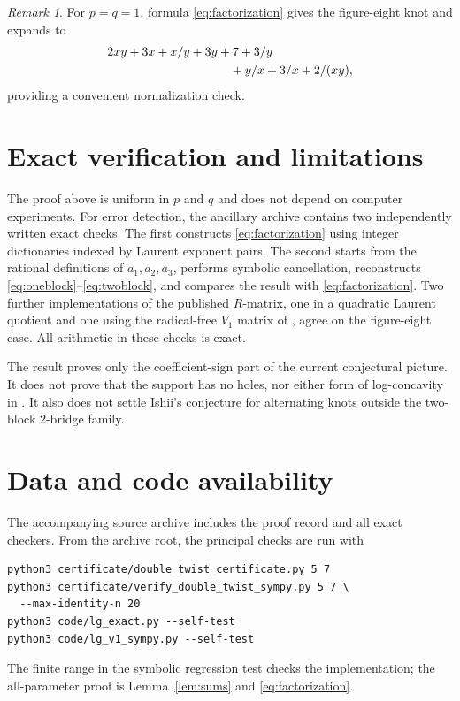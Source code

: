 \documentclass[11pt]{amsart}
\theoremstyle{remark}
\newtheorem{remark}[theorem]{Remark}
\begin{document}
\begin{remark}
For $p=q=1$, formula \eqref{eq:factorization} gives the figure-eight knot
and expands to
\begin{align*}
&2xy+3x+x/y+3y+7+3/y\\
&\hspace{35mm}+y/x+3/x+2/(xy),
\end{align*}
providing a convenient normalization check.
\end{remark}

\section{Exact verification and limitations}

The proof above is uniform in $p$ and $q$ and does not depend on computer
experiments.  For error detection, the ancillary archive contains two
independently written exact checks.  The first constructs
\eqref{eq:factorization} using integer dictionaries indexed by Laurent
exponent pairs.  The second starts from the rational definitions of
$a_1,a_2,a_3$, performs symbolic cancellation, reconstructs
\eqref{eq:oneblock}--\eqref{eq:twoblock}, and compares the result with
\eqref{eq:factorization}.  Two further implementations of the published
$R$-matrix, one in a quadratic Laurent quotient and one using the
radical-free $V_1$ matrix of \cite{Skein2026}, agree on the figure-eight
case.  All arithmetic in these checks is exact.

The result proves only the coefficient-sign part of the current conjectural
picture.  It does not prove that the support has no holes, nor either form of
log-concavity in \cite{HKST2025,GLY2026}.  It also does not settle Ishii's
conjecture for alternating knots outside the two-block $2$-bridge family.

\section*{Data and code availability}

The accompanying source archive includes the proof record and all exact
checkers.  From the archive root, the principal checks are run with
\begin{verbatim}
python3 certificate/double_twist_certificate.py 5 7
python3 certificate/verify_double_twist_sympy.py 5 7 \
  --max-identity-n 20
python3 code/lg_exact.py --self-test
python3 code/lg_v1_sympy.py --self-test
\end{verbatim}
The finite range in the symbolic regression test checks the implementation;
the all-parameter proof is Lemma~\ref{lem:sums} and
\eqref{eq:factorization}.



\end{document}
